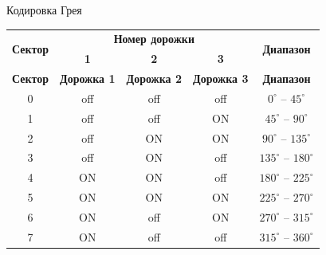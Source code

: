 \begin{frame}{Кодировка Грея}
    \begin{longtable}[c]{|c|c|c|c|c|}
        \hline
        \multirow{2}{*}{\textbf{Сектор}} & \multicolumn{3}{|c|}{\textbf{Номер дорожки}} & \multirow{2}{*}{\textbf{Диапазон}}\\
        \cline{2-4}
        & \textbf{1} & \textbf{2} & \textbf{3} &\\
        \hline
        \endfirsthead
        \hline
        \textbf{Сектор} & \textbf{Дорожка 1} & \textbf{Дорожка 2} & \textbf{Дорожка 3} & \textbf{Диапазон}\\
        \hline
        \endhead
        0 & off & off & off & $0^{\circ}$ -- $45^{\circ}$\\
        \hline
        1 & off & off & \cellcolor{green!20}ON & $45^{\circ}$ -- $90^{\circ}$\\
        \hline
        2 & off & \cellcolor{green!20}ON & \cellcolor{green!20}ON & $90^{\circ}$ -- $135^{\circ}$\\
        \hline
        3 & off & \cellcolor{green!20}ON & off & $135^{\circ}$ -- $180^{\circ}$\\
        \hline
        4 & \cellcolor{green!20}ON & \cellcolor{green!20}ON & off & $180^{\circ}$ -- $225^{\circ}$\\
        \hline
        5 & \cellcolor{green!20}ON & \cellcolor{green!20}ON & \cellcolor{green!20}ON & $225^{\circ}$ -- $270^{\circ}$\\
        \hline
        6 & \cellcolor{green!20}ON & off & \cellcolor{green!20}ON & $270^{\circ}$ -- $315^{\circ}$\\
        \hline
        7 & \cellcolor{green!20}ON & off & off & $315^{\circ}$ -- $360^{\circ}$\\
        \hline
    \end{longtable}
\end{frame}

